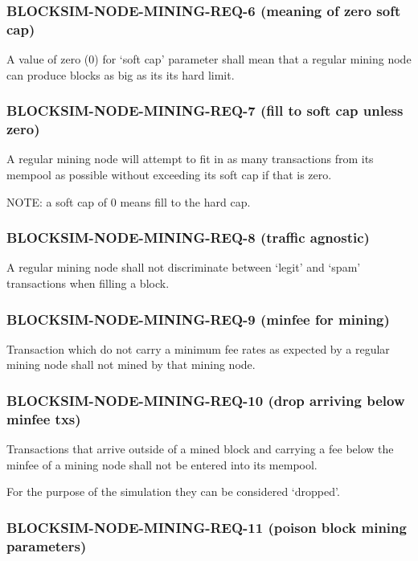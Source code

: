 \documentclass{scrreprt}
\begin{document}
\subsubsection{BLOCKSIM-NODE-MINING-REQ-6 (meaning of zero soft cap)}

A value of zero (0) for `soft cap' parameter shall mean that a regular mining
node can produce blocks as big as its its hard limit.


\subsubsection{BLOCKSIM-NODE-MINING-REQ-7 (fill to soft cap unless zero)}

A regular mining node will attempt to fit in as many transactions from its mempool
as possible without exceeding its soft cap if that is zero.

NOTE: a soft cap of 0 means fill to the hard cap.


\subsubsection{BLOCKSIM-NODE-MINING-REQ-8 (traffic agnostic)}

A regular mining node shall not discriminate between `legit' and `spam' transactions
when filling a block.

\subsubsection{BLOCKSIM-NODE-MINING-REQ-9 (minfee for mining)}

Transaction which do not carry a minimum fee rates as expected by a regular mining
node shall not mined by that mining node.


\subsubsection{BLOCKSIM-NODE-MINING-REQ-10 (drop arriving below minfee txs)}

Transactions that arrive outside of a mined block and carrying a fee below
the minfee of a mining node shall not be entered into its mempool.

For the purpose of the simulation they can be considered `dropped'.

\subsubsection{BLOCKSIM-NODE-MINING-REQ-11 (poison block mining parameters)}
\end{document}
